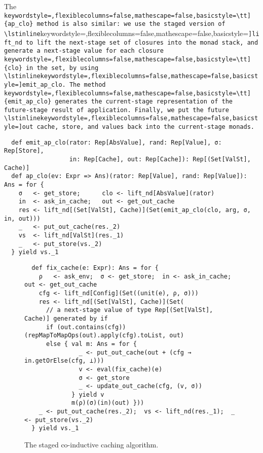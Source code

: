 The \lstinline[keywordstyle=,flexiblecolumns=false,mathescape=false,basicstyle=\tt]{ap_clo} method is also similar: we use the staged version of \lstinline[keywordstyle=,flexiblecolumns=false,mathescape=false,basicstyle=\tt]{lift_nd} to
lift the next-stage set of closures into the monad stack, and generate a
next-stage value for each closure \lstinline[keywordstyle=,flexiblecolumns=false,mathescape=false,basicstyle=\tt]{clo} in the set, by using \lstinline[keywordstyle=,flexiblecolumns=false,mathescape=false,basicstyle=\tt]{emit_ap_clo}. The
method \lstinline[keywordstyle=,flexiblecolumns=false,mathescape=false,basicstyle=\tt]{emit_ap_clo} generates the current-stage representation of the
future-stage result of application.
Finally, we put the future \lstinline[keywordstyle=,flexiblecolumns=false,mathescape=false,basicstyle=\tt]{out} cache, store, and values back into
the current-stage monads.
\begin{lstlisting}
  def emit_ap_clo(rator: Rep[AbsValue], rand: Rep[Value], σ: Rep[Store],
                  in: Rep[Cache], out: Rep[Cache]): Rep[(Set[ValSt], Cache)]
  def ap_clo(ev: Expr => Ans)(rator: Rep[Value], rand: Rep[Value]): Ans = for {
    σ   <- get_store;      clo <- lift_nd[AbsValue](rator)
    in  <- ask_in_cache;   out <- get_out_cache
    res <- lift_nd[(Set[ValSt], Cache)](Set(emit_ap_clo(clo, arg, σ, in, out)))
    _   <- put_out_cache(res._2)
    vs  <- lift_nd[ValSt](res._1)
    _   <- put_store(vs._2)
  } yield vs._1
\end{lstlisting}


\begin{figure}[h!]
  \centering
\begin{lstlisting}
  def fix_cache(e: Expr): Ans = for {
    ρ   <- ask_env;  σ <- get_store;  in <- ask_in_cache;  out <- get_out_cache
    cfg <- lift_nd[Config](Set((unit(e), ρ, σ)))
    res <- lift_nd[(Set[ValSt], Cache)](Set(
      // a next-stage value of type Rep[(Set[ValSt], Cache)] generated by if
      if (out.contains(cfg)) (repMapToMapOps(out).apply(cfg).toList, out)
      else { val m: Ans = for {
               _ <- put_out_cache(out + (cfg → in.getOrElse(cfg, ⊥)))
               v <- eval(fix_cache)(e)
               σ <- get_store
               _ <- update_out_cache(cfg, (v, σ))
             } yield v
             m(ρ)(σ)(in)(out) }))
    _ <- put_out_cache(res._2);  vs <- lift_nd(res._1);  _ <- put_store(vs._2)
  } yield vs._1
\end{lstlisting}
\caption{The staged co-inductive caching algorithm.}
\label{fig:staged_coind_cache}
\end{figure}

